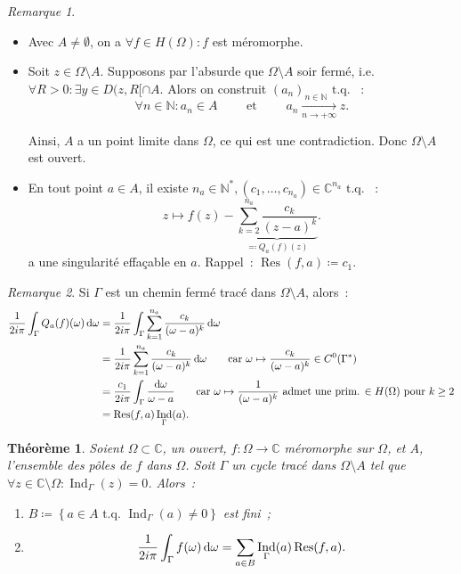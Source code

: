 \documentclass{report}
\newtheorem{thm}{Théorème}[chapter]
\theoremstyle{definition}
\theoremstyle{remark}
\newtheorem*{rmq}{Remarque}
\numberwithin{equation}{section}
\newcommand{\C}{\mathbb C}
\newcommand{\N}{\mathbb N}
\newcommand{\Ns}{\N^{*}}
\newcommand{\tq}{\text{ t.q. }}
\DeclareMathOperator{\Ind}{Ind}
\DeclareMathOperator{\Res}{Res}
\newcommand{\pinfty}{{+\infty}}
\begin{document}
			\begin{rmq}~
			\begin{itemize}
				\item Avec $A \neq \emptyset$, on a $\forall f \in H(\Omega) : f$ est méromorphe.
				\item Soit $z \in \Omega \setminus A$. Supposons par l'absurde que $\Omega \setminus A$ soir fermé, i.e. $\forall R > 0 : \exists y \in D(z, R[ \cap A$.
				Alors on construit $(a_n)_{n \in \N} \tq$~:
				\begin{equation}
					\forall n \in \N : a_n \in A \qquad \text{ et } \qquad a_n \xrightarrow[n \to \pinfty]{} z.
				\end{equation}

				Ainsi, $A$ a un point limite dans $\Omega$, ce qui est une contradiction. Donc $\Omega \setminus A$ est ouvert.
				\item En tout point $a \in A$, il existe $n_a \in \Ns, (c_1, \ldots, c_{n_a}) \in \C^{n_a} \tq$~:
				\begin{equation}
					z \mapsto f(z) - \underbrace {\sum_{k=2}^{n_a}\frac {c_k}{(z-a)^k}}_{\eqqcolon Q_a(f)(z)}.
				\end{equation}
				a une singularité effaçable en $a$. Rappel~: $\Res(f, a) \coloneqq c_1$.
			\end{itemize}
			\end{rmq}

			\begin{rmq} Si $\Gamma$ est un chemin fermé tracé dans $\Omega \setminus A$, alors~:
			\begin{align}
				\frac 1{2i\pi}\int_\Gamma Q_a(f)(\omega)\dif \omega &= \frac 1{2i\pi}\int_\Gamma\sum_{k=1}^{n_a}\frac {c_k}{(\omega-a)^k}\dif \omega \\
				&= \frac 1{2i\pi}\sum_{k=1}^{n_a}\frac {c_k}{(\omega-a)^k}\dif \omega \qquad \text{car $\omega \mapsto \frac {c_k}{(\omega-a)^k} \in C^0(\Gamma^*)$} \\
				&= \frac {c_1}{2i\pi}\int_\Gamma \frac {\dif \omega}{\omega-a} \qquad \text{car $\omega \mapsto \frac 1{(\omega-a)^k}$ admet une prim. $\in H(\Omega)$ pour $k \geq 2$} \\
				&= \Res(f, a)\Ind_\Gamma(a).
			\end{align}
			\end{rmq}

			\begin{thm} Soient $\Omega \subset \C$, un ouvert, $f : \Omega \to \C$ méromorphe sur $\Omega$, et $A$, l'ensemble des pôles de $f$ dans $\Omega$. Soit $\Gamma$
			un cycle tracé dans $\Omega \setminus A$ tel que $\forall z \in \C \setminus \Omega : \Ind_\Gamma(z) = 0$.
			Alors~:
			\begin{enumerate}
				\item $B \coloneqq \left\{a \in A \tq \Ind_\Gamma(a) \neq 0\right\}$ est fini~;
				\item
				\begin{equation}\label{eq:thm résidus}
					\frac 1{2i\pi}\int_\Gamma f(\omega)\dif \omega = \sum_{a \in B}\Ind_\Gamma(a)\Res(f, a).
				\end{equation}
			\end{enumerate}
			\end{thm}
\end{document}
